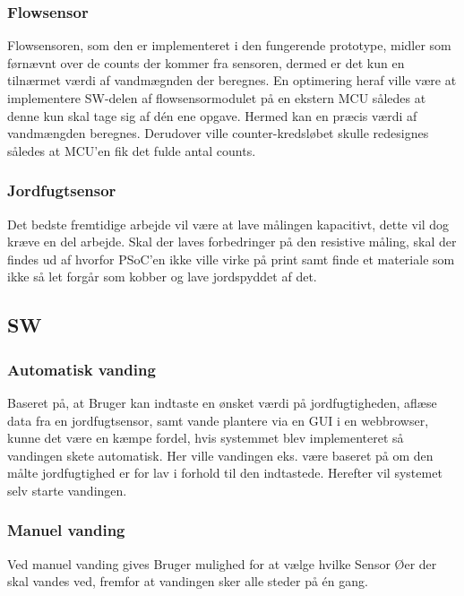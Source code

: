 \subsubsection{Flowsensor}
Flowsensoren, som den er implementeret i den fungerende prototype, midler som førnævnt over de counts der kommer fra sensoren, dermed er det kun en tilnærmet værdi af vandmægnden der beregnes. En optimering heraf ville være at implementere SW-delen af flowsensormodulet på en ekstern MCU således at denne kun skal tage sig af dén ene opgave. Hermed kan en præcis værdi af vandmængden beregnes. Derudover ville counter-kredsløbet skulle redesignes således at MCU'en fik det fulde antal counts.\newline
 
\subsubsection{Jordfugtsensor}
Det bedste fremtidige arbejde vil være at lave målingen kapacitivt, dette vil dog kræve en del arbejde. Skal der laves forbedringer på den resistive måling, skal der findes ud af hvorfor PSoC'en ikke ville virke på print samt finde et materiale som ikke så let forgår som kobber og lave jordspyddet af det. 
 
 
 \subsection{SW} 
\subsubsection{Automatisk vanding}
Baseret på, at Bruger kan indtaste en ønsket værdi på jordfugtigheden, aflæse data fra en jordfugtsensor, samt vande plantere via en GUI i en webbrowser, kunne det være en kæmpe fordel, hvis systemmet blev implementeret så vandingen skete automatisk. Her ville vandingen eks. være baseret på om den målte jordfugtighed er for lav i forhold til den indtastede. Herefter vil systemet selv starte vandingen.\newline 

\subsubsection{Manuel vanding}
Ved manuel vanding gives Bruger mulighed for at vælge hvilke Sensor Øer der skal vandes ved, fremfor at vandingen sker alle steder på én gang.\newline 

